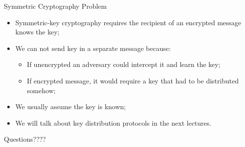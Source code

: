 \documentclass[12pt]{beamer}
\begin{document}
\begin{frame}{Symmetric Cryptography Problem}
\begin{itemize}
\item Symmetric-key cryptography requires the recipient of an encrypted message knows the key;\pause
\item We can not send key in a separate message because:\pause
\begin{itemize}
\item If unencrypted an adversary could intercept it and learn the key;\pause
\item If encrypted message, it would require a key that had to be distributed somehow;\pause
\end{itemize} 
\item We usually assume the key is known;\pause
\item We will talk about key distribution protocols in the next lectures.
\end{itemize}
\end{frame}

{
\begin{frame}

{\LARGE Questions????}

\end{frame}
}
\end{document}
